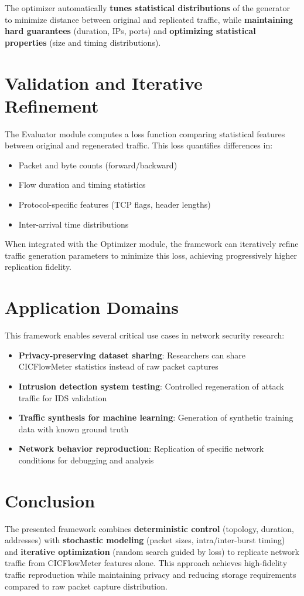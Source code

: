 \documentclass[11pt,a4paper]{article}
\begin{document}
The optimizer automatically \textbf{tunes statistical distributions} of the generator to minimize distance between original and replicated traffic, while \textbf{maintaining hard guarantees} (duration, IPs, ports) and \textbf{optimizing statistical properties} (size and timing distributions).

\section{Validation and Iterative Refinement}

The Evaluator module computes a loss function comparing statistical features between original and regenerated traffic. This loss quantifies differences in:
\begin{itemize}
    \item Packet and byte counts (forward/backward)
    \item Flow duration and timing statistics
    \item Protocol-specific features (TCP flags, header lengths)
    \item Inter-arrival time distributions
\end{itemize}

When integrated with the Optimizer module, the framework can iteratively refine traffic generation parameters to minimize this loss, achieving progressively higher replication fidelity.

\section{Application Domains}

This framework enables several critical use cases in network security research:
\begin{itemize}
    \item \textbf{Privacy-preserving dataset sharing}: Researchers can share CICFlowMeter statistics instead of raw packet captures
    \item \textbf{Intrusion detection system testing}: Controlled regeneration of attack traffic for IDS validation
    \item \textbf{Traffic synthesis for machine learning}: Generation of synthetic training data with known ground truth
    \item \textbf{Network behavior reproduction}: Replication of specific network conditions for debugging and analysis
\end{itemize}

\section{Conclusion}

The presented framework combines \textbf{deterministic control} (topology, duration, addresses) with \textbf{stochastic modeling} (packet sizes, intra/inter-burst timing) and \textbf{iterative optimization} (random search guided by loss) to replicate network traffic from CICFlowMeter features alone. This approach achieves high-fidelity traffic reproduction while maintaining privacy and reducing storage requirements compared to raw packet capture distribution.
\end{document}
